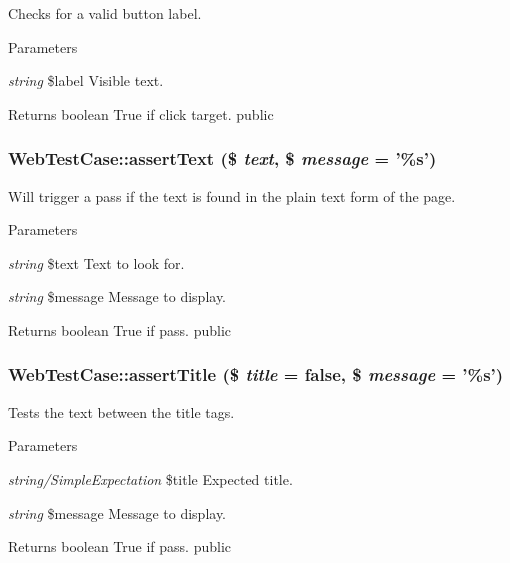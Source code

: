 \label{class_web_test_case_a56874c6913a45fe55a581128a1e956e4}
Checks for a valid button label. 
\begin{DoxyParams}{Parameters}
\item[{\em string}]\$label Visible text. \end{DoxyParams}
\begin{DoxyReturn}{Returns}
boolean True if click target.  public 
\end{DoxyReturn}
\hypertarget{class_web_test_case_aa458bde36e4dd8038e76974c42fe4822}{
\subsubsection[{assertText}]{\setlength{\rightskip}{0pt plus 5cm}WebTestCase::assertText (\$ {\em text}, \/  \$ {\em message} = {\ttfamily '\%s'})}}
\label{class_web_test_case_aa458bde36e4dd8038e76974c42fe4822}
Will trigger a pass if the text is found in the plain text form of the page. 
\begin{DoxyParams}{Parameters}
\item[{\em string}]\$text Text to look for. \item[{\em string}]\$message Message to display. \end{DoxyParams}
\begin{DoxyReturn}{Returns}
boolean True if pass.  public 
\end{DoxyReturn}
\hypertarget{class_web_test_case_a8639e24b9991384e695dbe58719bc6b8}{
\subsubsection[{assertTitle}]{\setlength{\rightskip}{0pt plus 5cm}WebTestCase::assertTitle (\$ {\em title} = {\ttfamily false}, \/  \$ {\em message} = {\ttfamily '\%s'})}}
\label{class_web_test_case_a8639e24b9991384e695dbe58719bc6b8}
Tests the text between the title tags. 
\begin{DoxyParams}{Parameters}
\item[{\em string/SimpleExpectation}]\$title Expected title. \item[{\em string}]\$message Message to display. \end{DoxyParams}
\begin{DoxyReturn}{Returns}
boolean True if pass.  public 
\end{DoxyReturn}

